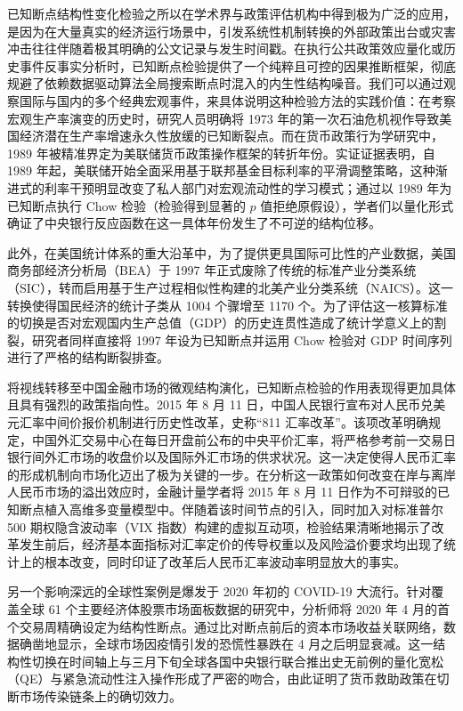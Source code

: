 \documentclass[UTF8,a4paper,12pt]{ctexbook}
\begin{document}
已知断点结构性变化检验之所以在学术界与政策评估机构中得到极为广泛的应用，是因为在大量真实的经济运行场景中，引发系统性机制转换的外部政策出台或灾害冲击往往伴随着极其明确的公文记录与发生时间戳。在执行公共政策效应量化或历史事件反事实分析时，已知断点检验提供了一个纯粹且可控的因果推断框架，彻底规避了依赖数据驱动算法全局搜索断点时混入的内生性结构噪音。我们可以通过观察国际与国内的多个经典宏观事件，来具体说明这种检验方法的实践价值：在考察宏观生产率演变的历史时，研究人员明确将 1973 年的第一次石油危机视作导致美国经济潜在生产率增速永久性放缓的已知断裂点。而在货币政策行为学研究中，1989 年被精准界定为美联储货币政策操作框架的转折年份。实证证据表明，自 1989 年起，美联储开始全面采用基于联邦基金目标利率的平滑调整策略，这种渐进式的利率干预明显改变了私人部门对宏观流动性的学习模式；通过以 1989 年为已知断点执行 Chow 检验（检验得到显著的 $p$ 值拒绝原假设），学者们以量化形式确证了中央银行反应函数在这一具体年份发生了不可逆的结构位移。

此外，在美国统计体系的重大沿革中，为了提供更具国际可比性的产业数据，美国商务部经济分析局（BEA）于 1997 年正式废除了传统的标准产业分类系统（SIC），转而启用基于生产过程相似性构建的北美产业分类系统（NAICS）。这一转换使得国民经济的统计子类从 1004 个骤增至 1170 个。为了评估这一核算标准的切换是否对宏观国内生产总值（GDP）的历史连贯性造成了统计学意义上的割裂，研究者同样直接将 1997 年设为已知断点并运用 Chow 检验对 GDP 时间序列进行了严格的结构断裂排查。

将视线转移至中国金融市场的微观结构演化，已知断点检验的作用表现得更加具体且具有强烈的政策指向性。2015 年 8 月 11 日，中国人民银行宣布对人民币兑美元汇率中间价报价机制进行历史性改革，史称“811 汇率改革”。该项改革明确规定，中国外汇交易中心在每日开盘前公布的中央平价汇率，将严格参考前一交易日银行间外汇市场的收盘价以及国际外汇市场的供求状况。这一决定使得人民币汇率的形成机制向市场化迈出了极为关键的一步。在分析这一政策如何改变在岸与离岸人民币市场的溢出效应时，金融计量学者将 2015 年 8 月 11 日作为不可辩驳的已知断点植入高维多变量模型中。伴随着该时间节点的引入，同时加入对标准普尔 500 期权隐含波动率（VIX 指数）构建的虚拟互动项，检验结果清晰地揭示了改革发生前后，经济基本面指标对汇率定价的传导权重以及风险溢价要求均出现了统计上的根本改变，同时印证了改革后人民币汇率波动率明显放大的事实。

另一个影响深远的全球性案例是爆发于 2020 年初的 COVID-19 大流行。针对覆盖全球 61 个主要经济体股票市场面板数据的研究中，分析师将 2020 年 4 月的首个交易周精确设定为结构性断点。通过比对断点前后的资本市场收益关联网络，数据确凿地显示，全球市场因疫情引发的恐慌性暴跌在 4 月之后明显衰减。这一结构性切换在时间轴上与三月下旬全球各国中央银行联合推出史无前例的量化宽松（QE）与紧急流动性注入操作形成了严密的吻合，由此证明了货币救助政策在切断市场传染链条上的确切效力。
\end{document}
